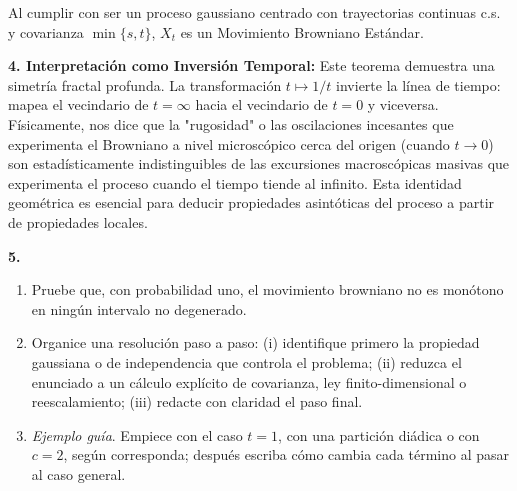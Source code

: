 \documentclass[11pt, letterpaper]{article}
\begin{document}
\begin{solucion}
    Al cumplir con ser un proceso gaussiano centrado con trayectorias continuas c.s. y covarianza $\min\{s, t\}$, $X_t$ es un Movimiento Browniano Estándar.

    \textbf{4. Interpretación como Inversión Temporal:}
    Este teorema demuestra una simetría fractal profunda. La transformación $t \mapsto 1/t$ invierte la línea de tiempo: mapea el vecindario de $t=\infty$ hacia el vecindario de $t=0$ y viceversa.
    Físicamente, nos dice que la "rugosidad" o las oscilaciones incesantes que experimenta el Browniano a nivel microscópico cerca del origen (cuando $t \to 0$) son estadísticamente indistinguibles de las excursiones macroscópicas masivas que experimenta el proceso cuando el tiempo tiende al infinito. Esta identidad geométrica es esencial para deducir propiedades asintóticas del proceso a partir de propiedades locales.
\end{solucion}

\newpage

\begin{ejercicio}
    \textbf{5.} 
    \begin{enumerate}
        \item Pruebe que, con probabilidad uno, el movimiento browniano no es monótono en ningún intervalo no degenerado.
        \item Organice una resolución paso a paso: (i) identifique primero la propiedad gaussiana o de independencia que controla el problema; (ii) reduzca el enunciado a un cálculo explícito de covarianza, ley finito-dimensional o reescalamiento; (iii) redacte con claridad el paso final.
        \item \textit{Ejemplo guía}. Empiece con el caso $t = 1$, con una partición diádica o con $c = 2$, según corresponda; después escriba cómo cambia cada término al pasar al caso general.
    \end{enumerate}
\end{ejercicio}

\vspace{5mm}
\end{document}
